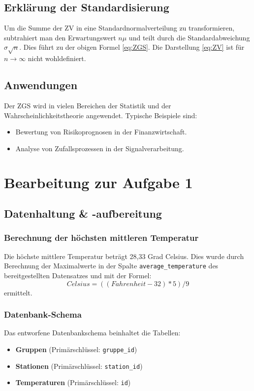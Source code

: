 \documentclass{article}
\begin{document}
\subsection{Erklärung der Standardisierung}

Um die Summe der ZV in eine Standardnormalverteilung zu transformieren, subtrahiert man den Erwartungswert $n\mu$ und teilt durch die Standardabweichung $\sigma \sqrt{n}$. Dies führt zu der obigen Formel \eqref{eq:ZGS}. Die Darstellung \eqref{eq:ZV} ist für $n \rightarrow \infty$ nicht wohldefiniert.
\subsection{Anwendungen}
Der ZGS wird in vielen Bereichen der Statistik und der Wahrscheinlichkeitstheorie angewendet. Typische Beispiele sind:
\begin{itemize}
    \item Bewertung von Risikoprognosen in der Finanzwirtschaft.
    \item Analyse von Zufallsprozessen in der Signalverarbeitung.
\end{itemize}

\newpage

\section{Bearbeitung zur Aufgabe 1}
\subsection{Datenhaltung \& -aufbereitung}
\subsubsection{Berechnung der höchsten mittleren Temperatur}
Die höchste mittlere Temperatur beträgt 28,33 Grad Celsius. Dies wurde durch Berechnung der Maximalwerte in der Spalte \texttt{average\_temperature} des bereitgestellten Datensatzes und mit der Formel:
\begin{equation} 
Celsius = ((Fahrenheit - 32) * 5) / 9 
\end{equation}
ermittelt.

\subsubsection{Datenbank-Schema}
Das entworfene Datenbankschema beinhaltet die Tabellen:
\begin{itemize}
    \item \textbf{Gruppen} (Primärschlüssel: \texttt{gruppe\_id})
    \item \textbf{Stationen} (Primärschlüssel: \texttt{station\_id})
    \item \textbf{Temperaturen} (Primärschlüssel: \texttt{id})
\end{itemize}
\end{document}
